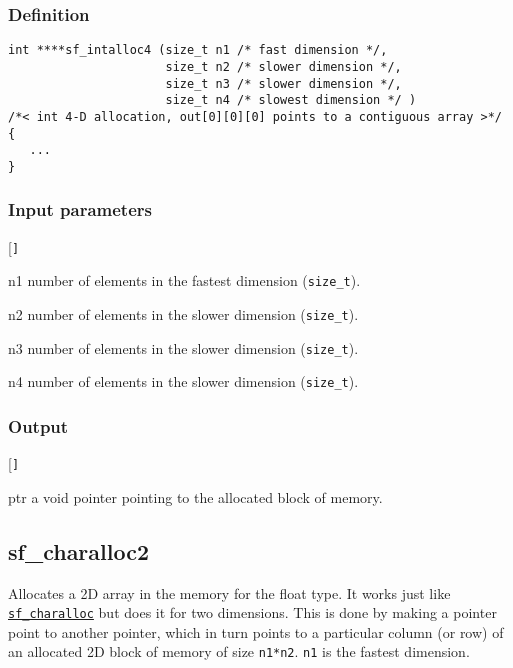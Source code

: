 \subsubsection*{Definition}
\begin{verbatim}
int ****sf_intalloc4 (size_t n1 /* fast dimension */, 
                      size_t n2 /* slower dimension */, 
                      size_t n3 /* slower dimension */,
                      size_t n4 /* slowest dimension */ )
/*< int 4-D allocation, out[0][0][0] points to a contiguous array >*/ 
{
   ...
}
\end{verbatim}

\subsubsection*{Input parameters}
\begin{desclist}{\tt }{\quad}[\tt ]
   \setlength\itemsep{0pt}
   \item[n1] number of elements in the fastest dimension (\texttt{size\_t}).
   \item[n2] number of elements in the slower dimension (\texttt{size\_t}).
   \item[n3] number of elements in the slower dimension (\texttt{size\_t}).
   \item[n4] number of elements in the slower dimension (\texttt{size\_t}).
\end{desclist}

\subsubsection*{Output}
\begin{desclist}{\tt }{\quad}[\tt ]
   \setlength\itemsep{0pt}
   \item[ptr] a void pointer pointing to the allocated block of memory.
\end{desclist}





\subsection{{sf\_charalloc2}}
Allocates a 2D array in the memory for the float type. It works just like \hyperref[sec:sf_charalloc]{\texttt{sf\_charalloc}} but does it for two dimensions. This is done by making a pointer point to another pointer, which in turn points to a particular column (or row) of an allocated 2D block of memory of size \texttt{n1*n2}. \texttt{n1} is the fastest dimension.


